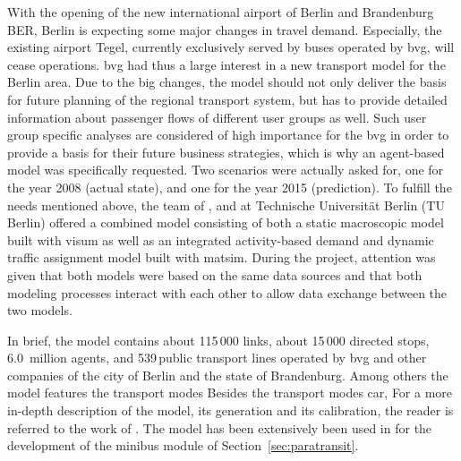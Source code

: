 With the opening of the new international airport of Berlin and Brandenburg BER,
Berlin is expecting some major changes in travel demand. Especially, the
existing airport Tegel, currently exclusively served by buses operated by \gls{bvg},
will cease operations. \gls{bvg} had thus a large interest in a new transport model
for the Berlin area. Due to the big changes, the model should not only deliver
the basis for future planning of the regional transport system, but has to
provide detailed information about passenger flows of different user groups as
well. Such user group specific analyses are considered of high importance for
the \gls{bvg} in order to provide a basis for their future business strategies, which
is why an agent-based model was specifically requested. Two scenarios were
actually asked for, one for the year 2008 (actual state), and one for the year
2015 (prediction). To fulfill the needs mentioned above, the team of 
\citet{PTV2013}, \citet{Senozon2013} and \citet{VSP2013} at Technische Universität Berlin (TU Berlin)
offered a combined model consisting of both a static macroscopic model built with
\gls{visum} as well as an integrated activity-based demand and
dynamic traffic assignment model built with \gls{matsim}. During
the project, attention was given that both models were based on the same data
sources and that both modeling processes interact with each other to allow data
exchange between the two models.

In brief, the model contains about 115\,000 links, %
about 15\,000 directed stops, %
6.0~million agents, %
and 539\,public transport lines operated by \gls{bvg} and other companies of the city
of Berlin and the state of Brandenburg. Among others the model features the transport 
modes Besides the transport modes car, For a more in-depth description of the
model, its generation and its calibration, the reader is referred to the work of
\cite{NeumannEtAl2014IatbrPtBerlinBook}. The model has been extensively been used in 
\citet[][Ch 7/8]{Neumann2014PhD} for the development of the minibus module of Section~\ref{sec:paratransit}.

